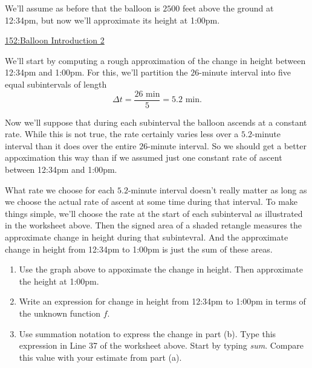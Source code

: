 \documentclass{ximera}
\begin{document}
\begin{example} \label{ExLKDrDEfRE9}

We'll assume as before that the balloon is $2500$ feet above the ground at 12:34pm, but now we'll approximate its height at 1:00pm.

\begin{onlineOnly}
    \begin{center}
\end{center}
\end{onlineOnly}

\href{https://www.desmos.com/calculator/h6cworakdw}{152:Balloon Introduction 2}

We'll start by computing a rough approximation of the change in height between 12:34pm and 1:00pm. For this, we'll partition the $26$-minute interval into five equal subintervals of length 
\[
  \Delta t = \frac{26\text{ min}}{5} = 5.2 \text{ min}.
\]
 
Now we'll suppose that during each subinterval the balloon ascends at a constant rate. While this is not true, the rate certainly varies less over a $5.2$-minute interval than it does over the entire $26$-minute interval. So we should get a better appoximation this way than if we assumed just one constant rate of ascent between 12:34pm and 1:00pm.

What rate we choose for each $5.2$-minute interval doesn't really matter as long as we choose the actual rate of ascent at some time during that interval. To make things simple, we'll choose the rate at the start of each subinterval as illustrated in the worksheet above. Then the signed area of a shaded retangle measures the approximate change in height during that subintevral. And the approximate change in height from 12:34pm to 1:00pm is just the sum of these areas.

\begin{enumerate}
\item Use the graph above to appoximate the change in height. Then approximate the height at 1:00pm.

\item Write an expression for change in height from 12:34pm to 1:00pm in terms of the unknown function $f$.

\item Use summation notation to express the change in part (b). Type this expression in Line 37 of the worksheet above. Start by typing \emph{sum}. Compare this value with your estimate from part (a).


\end{enumerate}
\end{example}
\end{document}
